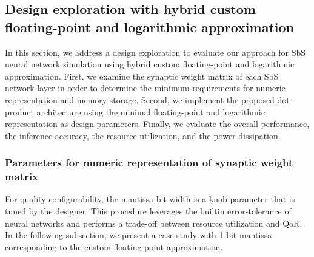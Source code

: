 \subsection{Design exploration with hybrid custom floating-point and logarithmic approximation}

In this section, we address a design exploration to evaluate our approach for SbS neural network simulation using hybrid custom floating-point and logarithmic approximation. First, we examine the synaptic weight matrix of each SbS network layer in order to determine the minimum requirements for numeric representation and memory storage. Second, we implement the proposed dot-product architecture using the minimal floating-point and logarithmic representation as design parameters. Finally, we evaluate the overall performance, the inference accuracy, the resource utilization, and the power dissipation.

\subsubsection{Parameters for numeric representation of synaptic weight matrix}
\label{sec:parameters}

For quality configurability, the mantissa bit-width is a knob parameter that is tuned by the designer. This procedure leverages the builtin error-tolerance of neural networks and performs a trade-off between resource utilization and QoR. In the following subsection, we present a case study with 1-bit mantissa corresponding to the custom floating-point approximation.

